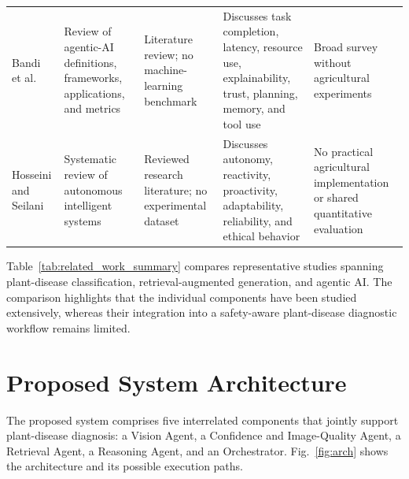 \documentclass[conference]{IEEEtran}
\begin{document}
\begin{table}[!t]
\begin{tabular}{p{2.0cm}p{2.8cm}p{3.2cm}p{4.0cm}p{3.5cm}}
Bandi et al.\ \cite{b11} & Review of agentic-AI definitions, frameworks, applications, and metrics & Literature review; no machine-learning benchmark & Discusses task completion, latency, resource use, explainability, trust, planning, memory, and tool use & Broad survey without agricultural experiments \\

Hosseini and Seilani \cite{b2} & Systematic review of autonomous intelligent systems & Reviewed research literature; no experimental dataset & Discusses autonomy, reactivity, proactivity, adaptability, reliability, and ethical behavior & No practical agricultural implementation or shared quantitative evaluation \\

\bottomrule
\end{tabular}
\renewcommand{\arraystretch}{1}
\end{table}

Table~\ref{tab:related_work_summary} compares representative studies spanning plant-disease classification, retrieval-augmented generation, and agentic AI. The comparison highlights that the individual components have been studied extensively, whereas their integration into a safety-aware plant-disease diagnostic workflow remains limited.

\section{Proposed System Architecture}
\label{sec:arch}

The proposed system comprises five interrelated components that jointly support plant-disease diagnosis: a Vision Agent, a Confidence and Image-Quality Agent, a Retrieval Agent, a Reasoning Agent, and an Orchestrator. Fig.~\ref{fig:arch} shows the architecture and its possible execution paths.
\end{document}
